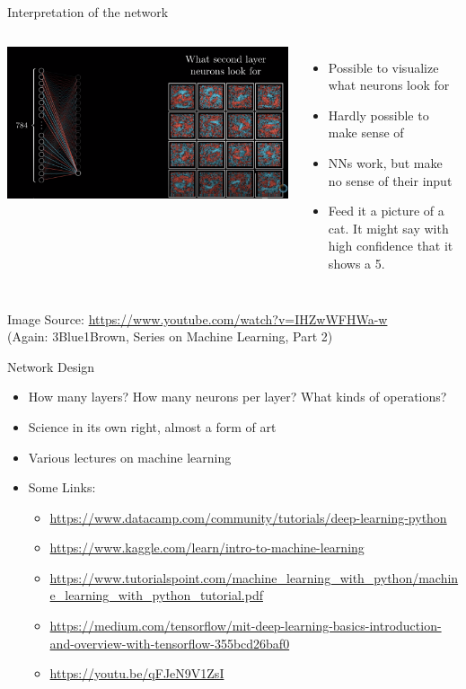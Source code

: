 \begin{frame}{Interpretation of the network}
%
\begin{columns}[T]
	\includegraphics[width=\linewidth]{./gfx/3b1b-activation}
%
	\begin{itemize}
	\item Possible to visualize what neurons look for
	\item Hardly possible to make sense of
	\item NNs work, but make no sense of their input
	\item Feed it a picture of a cat. It might say with high confidence that it shows a 5.
	\end{itemize}
\end{columns}
%
\vspace{12pt}
{
	\scriptsize
	Image Source: \url{https://www.youtube.com/watch?v=IHZwWFHWa-w}\\
	(Again: 3Blue1Brown, Series on Machine Learning, Part 2)
}
\end{frame}


\begin{frame}{Network Design}
%
\begin{itemize}
\item How many layers? How many neurons per layer? What kinds of operations?
\item[\Thus] Science in its own right, almost a form of art
\item Various lectures on machine learning
\item Some Links:
	\begin{itemize}
	\item \url{https://www.datacamp.com/community/tutorials/deep-learning-python}
	\item \url{https://www.kaggle.com/learn/intro-to-machine-learning}
	\item \url{https://www.tutorialspoint.com/machine_learning_with_python/machine_learning_with_python_tutorial.pdf}
	\item \url{https://medium.com/tensorflow/mit-deep-learning-basics-introduction-and-overview-with-tensorflow-355bcd26baf0}
	\item \url{https://youtu.be/qFJeN9V1ZsI}
	\end{itemize}
\end{itemize}
%
\end{frame}

